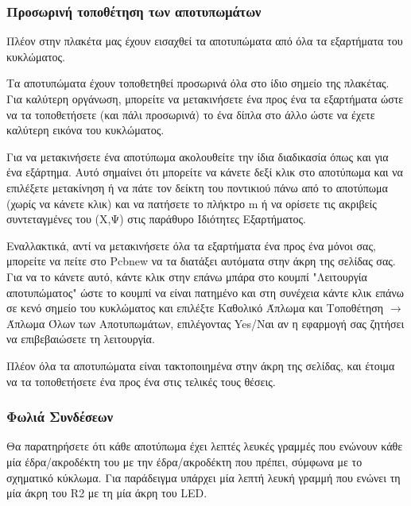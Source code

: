 \documentclass[a4paper]{article}
\begin{document}
\subsubsection{Προσωρινή τοποθέτηση των αποτυπωμάτων}
Πλέον στην πλακέτα μας έχουν εισαχθεί τα αποτυπώματα από όλα τα εξαρτήματα του κυκλώματος. 

Τα αποτυπώματα έχουν τοποθετηθεί προσωρινά όλα στο ίδιο σημείο της πλακέτας. Για καλύτερη οργάνωση, μπορείτε να μετακινήσετε ένα προς ένα τα εξαρτήματα ώστε να τα τοποθετήσετε (και πάλι προσωρινά) το ένα δίπλα στο άλλο ώστε να έχετε καλύτερη εικόνα του κυκλώματος. 

Για να μετακινήσετε ένα αποτύπωμα ακολουθείτε την ίδια διαδικασία όπως και για ένα εξάρτημα. Αυτό σημαίνει ότι μπορείτε να κάνετε δεξί κλικ στο αποτύπωμα και να επιλέξετε μετακίνηση ή να πάτε τον δείκτη του ποντικιού πάνω από το αποτύπωμα (χωρίς να κάνετε κλικ) και να πατήσετε το πλήκτρο m ή να ορίσετε τις ακριβείς συντεταγμένες του (Χ,Ψ) στις παράθυρο Ιδιότητες Εξαρτήματος. 

Εναλλακτικά, αντί να μετακινήσετε όλα τα εξαρτήματα ένα προς ένα μόνοι σας, μπορείτε να πείτε στο \textenglish{Pcbnew} να τα διατάξει αυτόματα στην άκρη της σελίδας σας. Για να το κάνετε αυτό, κάντε κλικ στην επάνω μπάρα στο κουμπί "Λειτουργία αποτυπώματος" ώστε το κουμπί να είναι πατημένο και στη συνέχεια κάντε κλικ επάνω σε κενό σημείο του κυκλώματος και επιλέξτε Καθολικό Άπλωμα και Τοποθέτηση $\rightarrow$ Άπλωμα Όλων των Αποτυπωμάτων, επιλέγοντας Yes/Ναι αν η εφαρμογή σας ζητήσει να επιβεβαιώσετε τη λειτουργία. 

Πλέον όλα τα αποτυπώματα είναι τακτοποιημένα στην άκρη της σελίδας, και έτοιμα να τα τοποθετήσετε ένα προς ένα στις τελικές τους θέσεις.

\begin{figure}
  \begin{center}
    \label{fig:kicad-main}
  \end{center}
\end{figure}

\subsubsection{Φωλιά Συνδέσεων}
Θα παρατηρήσετε ότι κάθε αποτύπωμα έχει λεπτές λευκές γραμμές που ενώνουν κάθε μία έδρα/ακροδέκτη του με την έδρα/ακροδέκτη που πρέπει, σύμφωνα με το σχηματικό κύκλωμα. Για παράδειγμα υπάρχει μία λεπτή λευκή γραμμή που ενώνει τη μία άκρη του R2 με τη μία άκρη του \textenglish{LED}. 
\end{document}
